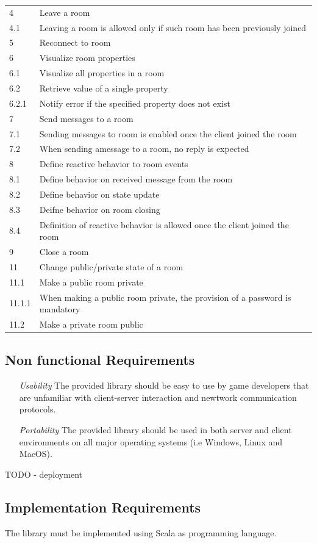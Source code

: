 \begin{center}
\begin{longtable}{|l|l|}
4       & Leave a room \\
4.1     & Leaving a room is allowed only if such room has been previously joined \\
5       & Reconnect to room \\
6       & Visualize room properties \\
6.1     & Visualize all properties in a room \\
6.2     & Retrieve value of a single property \\
6.2.1   & Notify error if the specified property does not exist \\
7       & Send messages to a room \\
7.1     & Sending messages to room is enabled once the client joined the room \\
7.2     & When sending amessage to a room, no reply is expected \\
8       & Define reactive behavior to room events \\
8.1     & Define behavior on received message from the room \\
8.2     & Define behavior on state update \\
8.3     & Deifne behavior on room closing \\
8.4     & Definition of reactive behavior is allowed once the client joined the room \\
9       & Close a room \\
11      & Change public/private state of a room \\
11.1    & Make a public room private \\
11.1.1  & When making a public room private, the provision of a password is mandatory \\ 
11.2    & Make a private room public \\
\hline

  \end{longtable}
\end{center}

\newpage

\subsection{Non functional Requirements} 

\begin{itemize}
	\item[\emph{Usability}] The provided library should be easy to use by game developers that are unfamiliar with client-server interaction and newtwork communication protocols.
	\item[\em{Portability}] The provided library should be used in both server and client environments on all major operating systems (i.e Windows, Linux and MacOS).
\end{itemize}


TODO
- deployment 


\subsection{Implementation Requirements}
The library must be implemented using Scala as programming language.
  
 
 

 